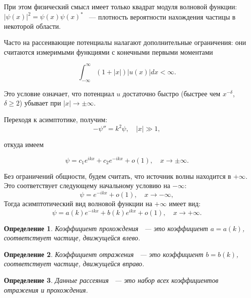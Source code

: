 \documentclass[a4 paper, 12 pt]{extarticle}
\newtheorem{Def}{Определение}[section]
\begin{document}
   При этом физический смысл имеет только квадрат модуля волновой функции: \linebreak $\left|\psi\left(x\right)\right|^2 = \psi\left(x\right) \psi\left(x\right)^*$ ~--- плотность вероятности нахождения частицы в некоторой области.
   
   Часто на рассеивающие потенциалы налагают дополнительные ограничения: они считаются измеримыми функциями с конечными первыми моментами
   
   \begin{equation*}
   \int_{-\infty}^{\infty}(1+|x|)|u(x)|dx<\infty.
   \end{equation*}
   
   Это условие означает, что потенциал $u$
   достаточно быстро (быстрее чем $x^{-\delta}$, $\delta\geq2$)
   убывает при $|x|\rightarrow\pm\infty$.
   
   Переходя к асимптотике, получим:
   $$
   -\psi''=k^2\psi, \quad |x|\gg1,
   $$

   откуда имеем
   
   $$
   \psi=c_1e^{ikx}+c_2e^{-ikx}+o(1), \quad x\rightarrow\pm\infty.
   $$
   
   Без ограничений общности, будем считать, что источник волны находится в $+\infty$. Это соответствует следующему начальному условию на $-\infty$:
   \begin{equation}\label{SchredBorderMInf}
   \psi=e^{-ikx}+o(1), \quad x\rightarrow-\infty,
   \end{equation}
   Тогда асимптотический вид волновой функции на $+\infty$ имеет вид:
   \begin{equation}\label{SchredBorderPInf}
   \psi=a(k)e^{-ikx}+b(k)e^{ikx}+o(1), \quad
   x\rightarrow+\infty.
   \end{equation}
   
   \begin{Def}
   	Коэффициент прохождения ~--- это коэффициент $a = a\left(k\right)$, соответствует частице, движущейся влево.
   \end{Def}

   \begin{Def}
   	Коэффициент отражения ~--- это коэффициент $b = b\left(k\right)$, соответствует частице, движущейся вправо.
   \end{Def}

   \begin{Def}
   Данные рассеяния ~--- это набор всех коэффициентов отражения и прохождения.
   \end{Def}
\end{document}
